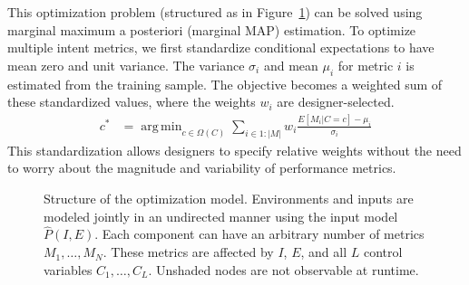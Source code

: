 \documentclass[letterpaper]{article}
\DeclareMathOperator*{\argmin}{arg\,min}
\begin{document}
This optimization problem (structured as in Figure~\ref{fig:optimization-model}) can be solved using marginal maximum a posteriori (marginal MAP) estimation.
To optimize multiple intent metrics, we first standardize conditional expectations to have mean zero and unit variance.
The variance $\sigma_i$ and mean $\mu_i$ for metric $i$ is estimated from the training sample.
The objective becomes a weighted sum of these standardized values, where the weights $w_i$ are designer-selected.
\begin{align}
	c^* &= \argmin_{c \in \Omega(C)} \sum_{i \in 1:|M|} w_i \frac{E[M_i|C=c] - \mu_i}{\sigma_i}
\end{align}
This standardization allows designers to specify relative weights without the need to worry about the magnitude and variability of performance metrics.

\begin{figure}[t]
	\centering
	\caption{Structure of the optimization model.
	Environments and inputs are modeled jointly in an undirected manner using the input model $\hat{P}(I, E)$.
	Each component can have an arbitrary number of metrics $M_1, \ldots, M_N$.
	These metrics are affected by $I$, $E$, and all $L$ control variables $C_1, \ldots, C_L$.
	Unshaded nodes are not observable at runtime.}
	\label{fig:optimization-model}
\end{figure}
\end{document}
